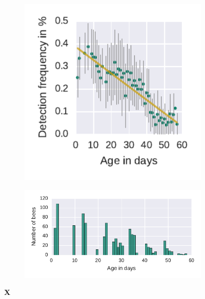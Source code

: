 \begin{figure}[htbp]
	\centering
	\begin{subfigure}[b]{0.33\textwidth}
	\centering
	\includegraphics[width=1.0\textwidth]{Figures/n3_detFvsAge}
	\caption[]{}
	\label{fig:n3detfVSage}
	\end{subfigure} 
	\begin{subfigure}[b]{0.66\textwidth}
	\centering
	\includegraphics[width=1.0\textwidth]{Figures/n3_ages.pdf}
	\caption[]{}
	\label{fig:n3ageDist}
	\end{subfigure}
	\caption[X]{\textbf{X}}
	\label{fig:ageDetF}
\end{figure}